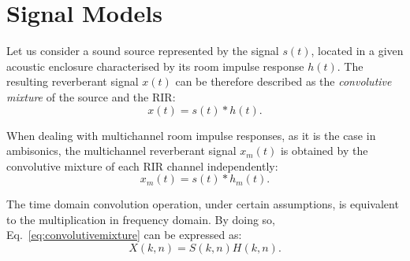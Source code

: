 %
%




\section{Signal Models}


Let us consider a sound source represented by the signal $s(t)$, located in a given acoustic enclosure characterised by its room impulse response $h(t)$. The resulting reverberant signal $x(t)$ can be therefore described as the \textit{convolutive mixture} of the source and the RIR: 
\begin{equation}
	x(t) = s(t) \ast h(t).
\label{eq:convolutivemixture}
\end{equation}

When dealing with multichannel room impulse responses, as it is the case in ambisonics, the multichannel reverberant signal $x_m(t)$ is obtained by the convolutive mixture of each RIR channel independently:
\begin{equation}
	x_m(t) = s(t) \ast h_m(t).
\label{eq:convolutivemixturemultichannel}
\end{equation}

The time domain convolution operation, under certain assumptions, is equivalent to the multiplication in frequency domain. By doing so, Eq.~\ref{eq:convolutivemixture} can be expressed as:
\begin{equation}
	X(k,n) = S(k,n) H(k,n).
\label{eq:multiplicativetransferfunction}
\end{equation}

